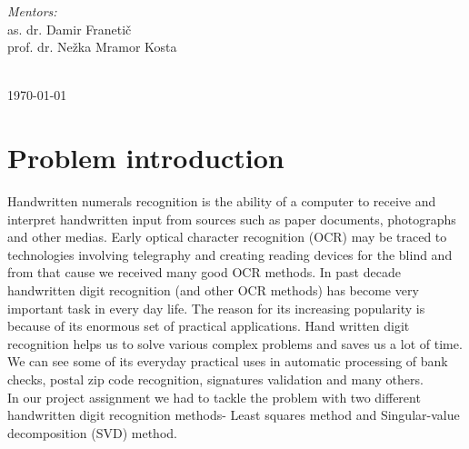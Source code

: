 \documentclass[12pt]{article}
\begin{document}
\begin{titlepage}
\begin{minipage}{0.5\textwidth}
\begin{flushleft} \large
	\emph{Mentors:}\\
	as. dr. Damir Franetič\\ %
	prof. dr. Nežka Mramor Kosta \vspace{0.7 cm}\\ %
\end{flushleft}


\end{minipage}\\[2cm]


{\large \today}\\[2cm] %

\vfill %

\end{titlepage}

\tableofcontents
\newpage
\listoffigures
\newpage

\section{Problem introduction}

Handwritten numerals recognition  is the ability of a computer to receive and interpret handwritten input from sources such as paper documents, photographs and other medias. Early optical character recognition (OCR) may be traced to technologies involving telegraphy and creating reading devices for the blind and from that cause we received many good OCR methods. In past decade handwritten digit recognition (and other OCR methods) has become very important task in every day life. The reason for its increasing popularity is because of its enormous set of practical applications. Hand written digit recognition helps us to solve various complex problems and saves us a lot of time. We can see some of its everyday practical uses in automatic processing of bank checks, postal zip code recognition, signatures validation and many others.\\
\newline
In our project assignment we had to tackle the problem with two different handwritten digit recognition methods- Least squares method and Singular-value decomposition (SVD) method.
\end{document}
